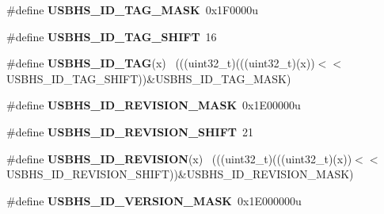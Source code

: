 \begin{DoxyCompactItemize}
\item 
\hypertarget{group___u_s_b_h_s___register___masks_ga3109b67c64df7ae32093d05762187b1e}{}\#define {\bfseries U\+S\+B\+H\+S\+\_\+\+I\+D\+\_\+\+T\+A\+G\+\_\+\+M\+A\+S\+K}~0x1\+F0000u\label{group___u_s_b_h_s___register___masks_ga3109b67c64df7ae32093d05762187b1e}

\item 
\hypertarget{group___u_s_b_h_s___register___masks_ga703b8ce169cc099fe46c3e710478b31e}{}\#define {\bfseries U\+S\+B\+H\+S\+\_\+\+I\+D\+\_\+\+T\+A\+G\+\_\+\+S\+H\+I\+F\+T}~16\label{group___u_s_b_h_s___register___masks_ga703b8ce169cc099fe46c3e710478b31e}

\item 
\hypertarget{group___u_s_b_h_s___register___masks_ga4481fdd0940662248a6dfd515309057a}{}\#define {\bfseries U\+S\+B\+H\+S\+\_\+\+I\+D\+\_\+\+T\+A\+G}(x)                                                ~(((uint32\+\_\+t)(((uint32\+\_\+t)(x))$<$$<$U\+S\+B\+H\+S\+\_\+\+I\+D\+\_\+\+T\+A\+G\+\_\+\+S\+H\+I\+F\+T))\&U\+S\+B\+H\+S\+\_\+\+I\+D\+\_\+\+T\+A\+G\+\_\+\+M\+A\+S\+K)\label{group___u_s_b_h_s___register___masks_ga4481fdd0940662248a6dfd515309057a}

\item 
\hypertarget{group___u_s_b_h_s___register___masks_ga2135bd8e0e2e81cc8a448c0e9ad64862}{}\#define {\bfseries U\+S\+B\+H\+S\+\_\+\+I\+D\+\_\+\+R\+E\+V\+I\+S\+I\+O\+N\+\_\+\+M\+A\+S\+K}~0x1\+E00000u\label{group___u_s_b_h_s___register___masks_ga2135bd8e0e2e81cc8a448c0e9ad64862}

\item 
\hypertarget{group___u_s_b_h_s___register___masks_ga9176c56178bbc72b0329ccf239461d90}{}\#define {\bfseries U\+S\+B\+H\+S\+\_\+\+I\+D\+\_\+\+R\+E\+V\+I\+S\+I\+O\+N\+\_\+\+S\+H\+I\+F\+T}~21\label{group___u_s_b_h_s___register___masks_ga9176c56178bbc72b0329ccf239461d90}

\item 
\hypertarget{group___u_s_b_h_s___register___masks_ga224f873ae31d29771b8440080974fdce}{}\#define {\bfseries U\+S\+B\+H\+S\+\_\+\+I\+D\+\_\+\+R\+E\+V\+I\+S\+I\+O\+N}(x)                                      ~(((uint32\+\_\+t)(((uint32\+\_\+t)(x))$<$$<$U\+S\+B\+H\+S\+\_\+\+I\+D\+\_\+\+R\+E\+V\+I\+S\+I\+O\+N\+\_\+\+S\+H\+I\+F\+T))\&U\+S\+B\+H\+S\+\_\+\+I\+D\+\_\+\+R\+E\+V\+I\+S\+I\+O\+N\+\_\+\+M\+A\+S\+K)\label{group___u_s_b_h_s___register___masks_ga224f873ae31d29771b8440080974fdce}

\item 
\hypertarget{group___u_s_b_h_s___register___masks_ga25bdbcc28c412d8291d1efcbf07192c7}{}\#define {\bfseries U\+S\+B\+H\+S\+\_\+\+I\+D\+\_\+\+V\+E\+R\+S\+I\+O\+N\+\_\+\+M\+A\+S\+K}~0x1\+E000000u\label{group___u_s_b_h_s___register___masks_ga25bdbcc28c412d8291d1efcbf07192c7}


\end{DoxyCompactItemize}

